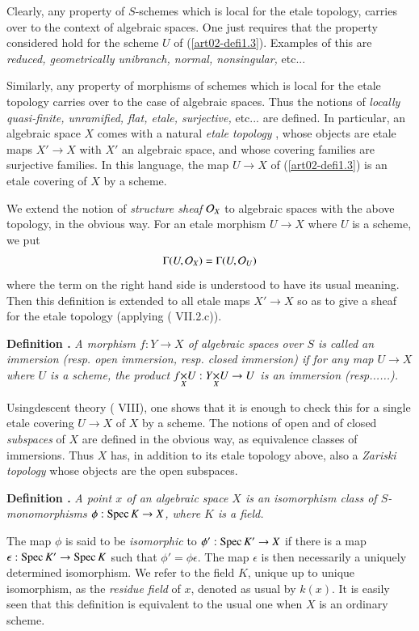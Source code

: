 Clearly, any property of $S$-schemes which is local for the etale topology, carries over to the context of algebraic spaces. One just requires that the property considered hold for the scheme $U$ of (\ref{art02-defi1.3}). Examples of this are {\em reduced, geometrically unibranch, normal, nonsingular,} etc...

Similarly, any property of morphisms of schemes which is local for the etale topology carries over to the case of algebraic spaces. Thus the notions of {\em locally quasi-finite, unramified, flat, etale, surjective,} etc... are defined. In particular, an algebraic space $X$ comes with a natural {\em etale topology} \cite{art02-key1}, whose objects are etale maps $X'\to X$ with $X'$ an algebraic space, and whose covering families are surjective families. In this language, the map $U\to X$ of (\ref{art02-defi1.3}) is an etale covering of $X$ by a scheme.

We extend the notion of {\em structure sheaf} $\mathcal{O}_{X}$ to algebraic spaces with the above topology, in the obvious way. For an etale morphism $U\to X$ where $U$ is a scheme, we put
$$
\Gamma (U,\mathcal{O}_{X})=\Gamma(U,\mathcal{O}_{U})
$$
where the term on the right hand side is understood to have its usual meaning. Then this definition is extended to all etale maps $X'\to X$ so as to give a sheaf for the etale topology (applying (\cite{art02-key6} VII.2.c)).

\medskip
\noindent
{\bf Definition .\label{art02-defi2.2}}
{\em A morphism $f:Y\to X$ of algebraic spaces over $S$ is called an immersion (resp. open immersion, resp. closed immersion) if for any map $U\to X$ where $U$ is a scheme, the product $\fprod{f}{U}{X}:\fprod{Y}{U}{X}\to U$ is an immersion (resp......).}

\eject

Using\pageoriginale descent theory (\cite{art02-key14} VIII), one shows that it is enough to check this for a single etale covering $U\to X$ of $X$ by a scheme. The notions of open and of closed {\em subspaces} of $X$ are defined in the obvious way, as equivalence classes of immersions. Thus $X$ has, in addition to its etale topology above, also a {\em Zariski topology} whose objects are the open subspaces.

\medskip
\noindent
{\bf Definition .\label{art02-defi2.3}}
{\em A point $x$ of an algebraic space $X$ is an isomorphism class of $S$-monomorphisms $\phi:\operatorname{Spec} K\to X$, where $K$ is a field.}
\smallskip

The map $\phi$ is said to be {\em isomorphic} to $\phi':\operatorname{Spec} K'\to X$ if there is a map $\epsilon : \operatorname{Spec} K'\to \operatorname{Spec} K$ such that $\phi'=\phi\epsilon$. The map $\epsilon$ is then necessarily a uniquely determined isomorphism. We refer to the field $K$, unique up to unique isomorphism, as the {\em residue field} of $x$, denoted as usual by $k(x)$. It is easily seen that this definition is equivalent to the usual one when $X$ is an ordinary scheme.


